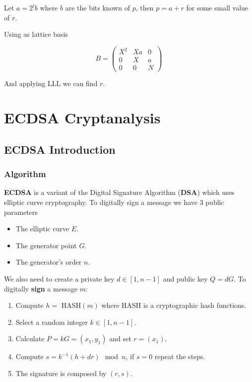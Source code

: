 \documentclass[a4paper,12pt]{report}
\begin{document}
Let $a = 2^lb$ where $b$ are the bits known of $p$, then $p = a + r$ for some small value of $r$.

Using as lattice basis

\[
    B = 
    \begin{pmatrix}
        X^2 & Xa & 0 \\
        0 & X & a \\
        0 & 0 & N
    \end{pmatrix} 
\]

And applying LLL we can find $r$.

\chapter{ECDSA Cryptanalysis}

\section{ECDSA Introduction}

\subsection{Algorithm}

\textbf{ECDSA} is a variant of the Digital Signature Algorithm (\textbf{DSA}) which uses elliptic curve cryptography.
To digitally sign a message we have 3 public parameters

\begin{itemize}
    \item The elliptic curve \textbf{$E$}.
    \item The generator point \textbf{$G$}.
    \item The generator's order \textbf{$n$}.
\end{itemize}

We also need to create a private key $d \in [1, n-1]$ and public key $Q = dG$. To digitally \textbf{sign} a message $m$:

\begin{enumerate}
    \item Compute $h = $ HASH$(m)$ where HASH is a cryptographic hash functions.
    \item Select a random integer $k \in [1, n-1]$.
    \item Calculate $P = kG = (x_1, y_1)$ and set $r = (x_1)$.
    \item Compute $s = k^{-1}(h + dr) \mod n$, if $s = 0$ repeat the steps.
    \item The signature is composed by $(r, s)$.
\end{enumerate}
\end{document}
